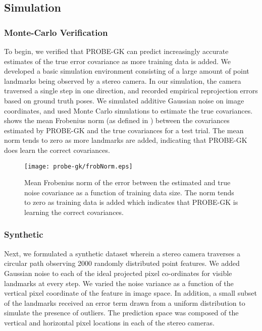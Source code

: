 \subsection{Simulation}
\subsubsection{Monte-Carlo Verification}
To begin, we verified that PROBE-GK can predict increasingly accurate estimates of the true error covariance as more training data is added. We developed a basic simulation environment consisting of a large amount of point landmarks being observed by a stereo camera. In our simulation, the camera traversed a single step in one direction, and recorded  empirical reprojection errors based on ground truth poses. We simulated additive Gaussian noise on image coordinates, and used Monte Carlo simulations to estimate the true covariances.  shows the mean Frobenius norm (as defined in \cite{Barfoot2014-ac}) between the covariances estimated by PROBE-GK and the true covariances for a test trial. The mean norm tends to zero as more landmarks are added, indicating that PROBE-GK does learn the correct covariances.


\begin{figure}
    \centering
      \texttt{[image: probe-gk/frobNorm.eps]}
     \caption{Mean Frobenius norm of the error between the estimated and true
       noise covariance as a function of training data size. The norm tends to
       zero as training data is added which indicates that PROBE-GK is learning
       the correct covariances.}
    \label{fig:probe_frobNorm}
\end{figure}


\subsubsection{Synthetic}

Next, we formulated a synthetic dataset wherein a stereo camera traverses a circular path observing 2000 randomly distributed point features.
We added Gaussian noise to each of the ideal projected
pixel co-ordinates for visible landmarks at every step. We varied the noise variance as a function of the vertical pixel coordinate of
the feature in image space. In addition, a small subset of the landmarks received an error term drawn from a uniform distribution to simulate the presence of outliers. The prediction space was composed of
the vertical and horizontal pixel locations in each of the stereo cameras.

